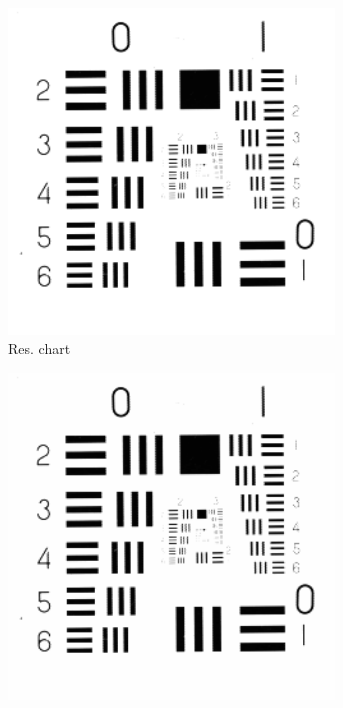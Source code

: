 \begin{figure}
\begin{subfigure}[b]{.23\textwidth}
  \centering
  \includegraphics[width=0.95\textwidth]{figures/test-images/original/resolutionchart}
  \caption{Res. chart}
  \label{fig:test-images-resolutionchart-original}
\end{subfigure}
\begin{subfigure}[b]{.23\textwidth}
  \centering
  \includegraphics[width=0.95\textwidth]{figures/test-images/truncate1/resolutionchart}

\end{subfigure}
\end{figure}
